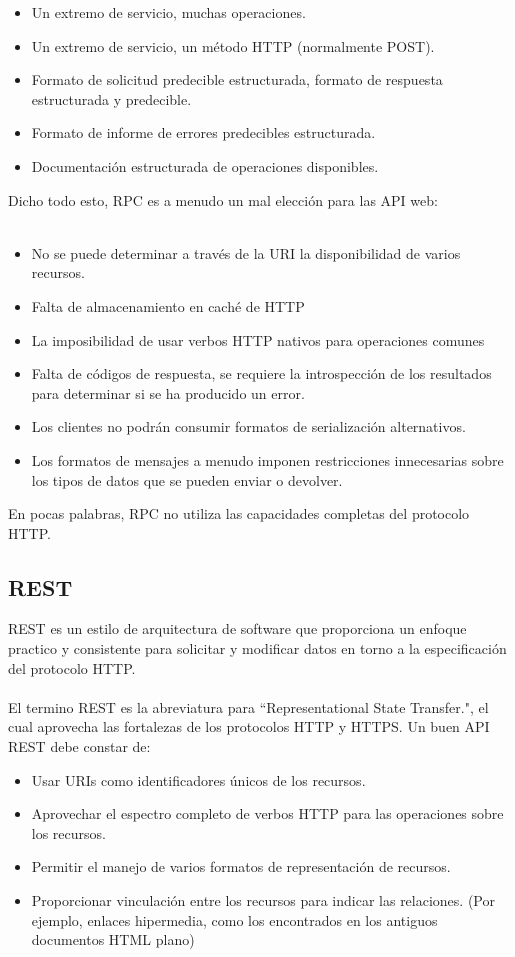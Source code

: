 \begin{itemize}
\item Un extremo de servicio, muchas operaciones.
\item Un extremo de servicio, un método HTTP (normalmente POST).
\item Formato de solicitud predecible estructurada, formato de respuesta estructurada y predecible.
\item Formato de informe de errores predecibles estructurada.
\item Documentación estructurada de operaciones disponibles.
\end{itemize}

Dicho todo esto, RPC es a menudo un mal elección para las API web:\\
\\
\begin{itemize}
\item No se puede determinar a través de la URI la disponibilidad de varios recursos.
\item Falta de almacenamiento en caché de HTTP
\item La imposibilidad de usar verbos HTTP nativos para operaciones comunes 
\item Falta de códigos de respuesta, se requiere la introspección de los resultados para determinar si se ha producido un error.
\item Los clientes no podrán consumir formatos de serialización alternativos.
\item Los formatos de mensajes a menudo imponen restricciones innecesarias sobre los tipos de datos que se pueden enviar o devolver.
\end{itemize}

En pocas palabras, RPC no utiliza las capacidades completas del protocolo HTTP.

\subsection{REST}
REST es un estilo de arquitectura de software que proporciona un enfoque practico y consistente para solicitar y modificar datos en torno a la especificación del protocolo HTTP. \\
\\
El termino REST es la abreviatura para ``Representational State Transfer.", el cual aprovecha las fortalezas de los protocolos HTTP y HTTPS. Un buen API REST debe constar de:
\begin{itemize}
\item Usar URIs como identificadores únicos de los recursos.
\item Aprovechar el espectro completo de verbos HTTP para las operaciones sobre los recursos.
\item Permitir el manejo de varios formatos de representación de recursos.
\item Proporcionar vinculación entre los recursos para indicar las relaciones. (Por ejemplo, enlaces hipermedia, como los encontrados en los antiguos documentos HTML plano)
\end{itemize}

